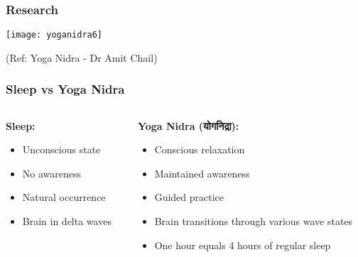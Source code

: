 \begin{frame}[fragile]\frametitle{Research}
      \begin{center}
        \texttt{[image: yoganidra6]}

		{\tiny (Ref: Yoga Nidra - Dr Amit Chail)}		
        \end{center}

\end{frame}

\begin{frame}[fragile]\frametitle{Sleep vs Yoga Nidra}
    \begin{columns}
        \begin{column}{0.48\textwidth}
            \textbf{Sleep:}
            \begin{itemize}
                \item Unconscious state
                \item No awareness
                \item Natural occurrence
                \item Brain in delta waves
            \end{itemize}
        \end{column}
        \begin{column}{0.48\textwidth}
            \textbf{Yoga Nidra (योगनिद्रा):}
            \begin{itemize}
                \item Conscious relaxation
                \item Maintained awareness
                \item Guided practice
                \item Brain transitions through various wave states
                \item One hour equals 4 hours of regular sleep
            \end{itemize}
        \end{column}
    \end{columns}
\end{frame}

